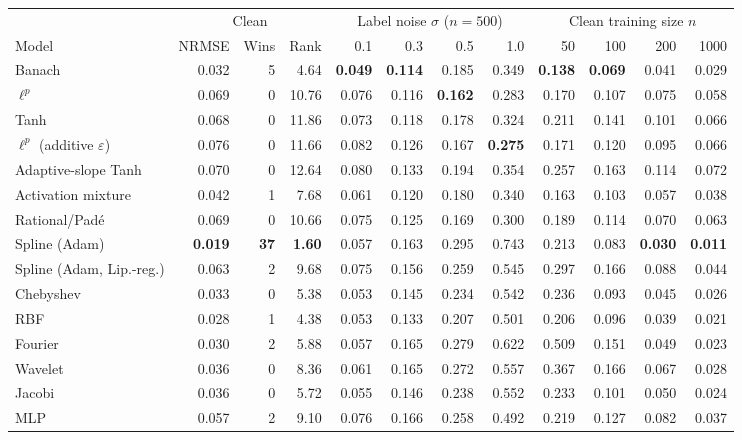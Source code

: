 \begin{tabular}{lrrrrrrrrrrr}
\toprule
& \multicolumn{3}{c}{Clean} & \multicolumn{4}{c}{Label noise $\sigma$ ($n=500$)} & \multicolumn{4}{c}{Clean training size $n$} \\
\cmidrule(lr){2-4}\cmidrule(lr){5-8}\cmidrule(lr){9-12}
Model & NRMSE & Wins & Rank & 0.1 & 0.3 & 0.5 & 1.0 & 50 & 100 & 200 & 1000 \\
\midrule
Banach & 0.032 & 5 & 4.64 & \textbf{0.049} & \textbf{0.114} & 0.185 & 0.349 & \textbf{0.138} & \textbf{0.069} & 0.041 & 0.029 \\
$\ell^p$ & 0.069 & 0 & 10.76 & 0.076 & 0.116 & \textbf{0.162} & 0.283 & 0.170 & 0.107 & 0.075 & 0.058 \\
Tanh & 0.068 & 0 & 11.86 & 0.073 & 0.118 & 0.178 & 0.324 & 0.211 & 0.141 & 0.101 & 0.066 \\
$\ell^p$ (additive $\varepsilon$) & 0.076 & 0 & 11.66 & 0.082 & 0.126 & 0.167 & \textbf{0.275} & 0.171 & 0.120 & 0.095 & 0.066 \\
Adaptive-slope Tanh & 0.070 & 0 & 12.64 & 0.080 & 0.133 & 0.194 & 0.354 & 0.257 & 0.163 & 0.114 & 0.072 \\
Activation mixture & 0.042 & 1 & 7.68 & 0.061 & 0.120 & 0.180 & 0.340 & 0.163 & 0.103 & 0.057 & 0.038 \\
Rational/Pad\'e & 0.069 & 0 & 10.66 & 0.075 & 0.125 & 0.169 & 0.300 & 0.189 & 0.114 & 0.070 & 0.063 \\
Spline (Adam) & \textbf{0.019} & \textbf{37} & \textbf{1.60} & 0.057 & 0.163 & 0.295 & 0.743 & 0.213 & 0.083 & \textbf{0.030} & \textbf{0.011} \\
Spline (Adam, Lip.-reg.) & 0.063 & 2 & 9.68 & 0.075 & 0.156 & 0.259 & 0.545 & 0.297 & 0.166 & 0.088 & 0.044 \\
Chebyshev & 0.033 & 0 & 5.38 & 0.053 & 0.145 & 0.234 & 0.542 & 0.236 & 0.093 & 0.045 & 0.026 \\
RBF & 0.028 & 1 & 4.38 & 0.053 & 0.133 & 0.207 & 0.501 & 0.206 & 0.096 & 0.039 & 0.021 \\
Fourier & 0.030 & 2 & 5.88 & 0.057 & 0.165 & 0.279 & 0.622 & 0.509 & 0.151 & 0.049 & 0.023 \\
Wavelet & 0.036 & 0 & 8.36 & 0.061 & 0.165 & 0.272 & 0.557 & 0.367 & 0.166 & 0.067 & 0.028 \\
Jacobi & 0.036 & 0 & 5.72 & 0.055 & 0.146 & 0.238 & 0.552 & 0.233 & 0.101 & 0.050 & 0.024 \\
MLP & 0.057 & 2 & 9.10 & 0.076 & 0.166 & 0.258 & 0.492 & 0.219 & 0.127 & 0.082 & 0.037 \\
\bottomrule
\end{tabular}
